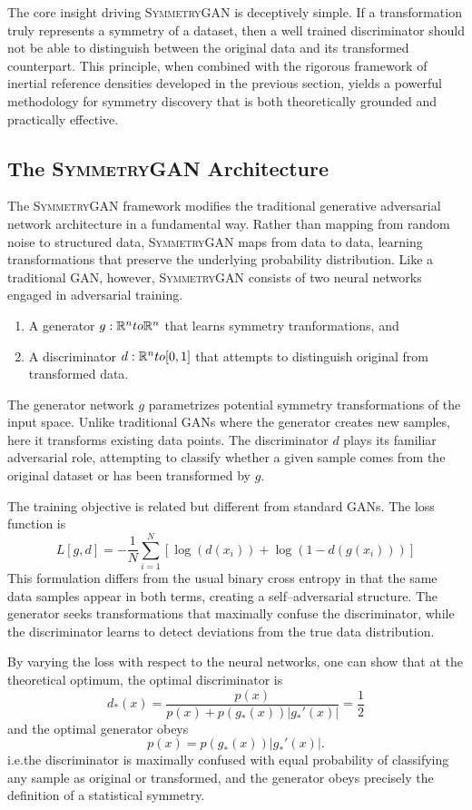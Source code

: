 The core insight driving \textsc{SymmetryGAN} is deceptively simple.
%
If a transformation truly represents a symmetry of a dataset, then a well trained discriminator should not be able to distinguish between the original data and its transformed counterpart.
%
This principle, when combined with the rigorous framework of inertial reference densities developed in the previous section, yields a powerful methodology for symmetry discovery that is both theoretically grounded and practically effective.
    \subsection{The \textsc{SymmetryGAN} Architecture}
    The \textsc{SymmetryGAN} framework modifies the traditional generative adversarial network architecture in a fundamental way.
    Rather than mapping from random noise to structured data, \textsc{SymmetryGAN} maps from data to data, learning transformations that preserve the underlying probability distribution.
    Like a traditional GAN, however, \textsc{SymmetryGAN} consists of two neural networks engaged in adversarial training.
    \begin{enumerate}
        \item A generator \(g: \mathbb{R}^n to \mathbb{R}^n\) that learns symmetry tranformations, and
        \item A discriminator \(d: \mathbb{R}^n to [0, 1]\) that attempts to distinguish original from transformed data.
    \end{enumerate}
    The generator network \(g\) parametrizes potential symmetry transformations of the input space.
    Unlike traditional GANs where the generator creates new samples, here it transforms existing data points.
    The discriminator \(d\) plays its familiar adversarial role, attempting to classify whether a given sample comes from the original dataset or has been transformed by \(g\).

    The training objective is related but different from standard GANs.
    The loss function is
    \[
        L[g,d] = -\frac{1}{N}\sum_{i=1}^{N}\left[\log(d(x_i)) + \log(1-d(g(x_i)))\right]
    \]
    This formulation differs from the usual binary cross entropy in that the same data samples appear in both terms, creating a self--adversarial structure.
    The generator seeks transformations that maximally confuse the discriminator, while the discriminator learns to detect deviations from the true data distribution.

    By varying the loss with respect to the neural networks, one can show that at the theoretical optimum, the optimal discriminator is
    \[
        d_*(x) = \frac{p(x)}{p(x) + p(g_*(x))|g_*'(x)|} = \frac{1}{2}
    \]
    and the optimal generator obeys
    \[
        p(x) = p(g_*(x))|g_*'(x)|.
    \]
    i.e.the discriminator is maximally confused with equal probability of classifying any sample as original or transformed, and the generator obeys precisely the definition of a statistical symmetry.

